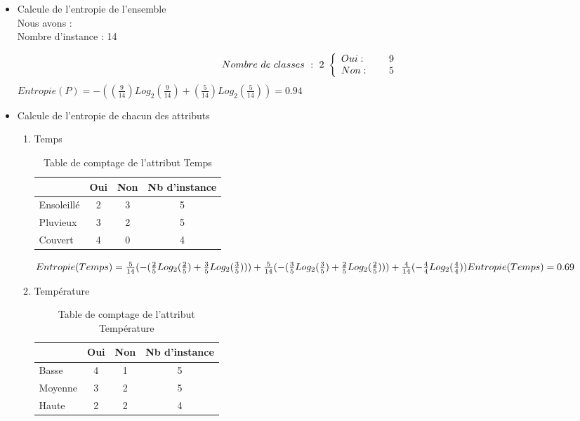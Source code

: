 \documentclass[a4paper, 11pt]{report}
\begin{document}
\begin{itemize}

\item Calcule de l'entropie de l'ensemble\\
Nous avons :\\
Nombre d'instance : 14

\[Nombre \ de \ classes \ : \ 2 \ \left\{ 
\begin{array}{l l}
  Oui : & \quad \text{ 9}\\
  Non : & \quad \text{ 5}\\ \end{array} \right. \]
$Entropie(P) = -((\frac{9}{14})Log_2(\frac{9}{14}) + (\frac{5}{14})Log_2(\frac{5}{14})) = 0.94$

\item Calcule de l'entropie de chacun des attributs
\begin{enumerate}
\item Temps 
\begin{table}[!h]
\begin{center}
\begin{tabular}{| l | c | c | c |}
\hline
 & Oui & Non & Nb d'instance\\
 \hline
Ensoleillé & 2 & 3 & 5 \\
\hline
Pluvieux & 3 & 2 & 5\\
\hline
Couvert & 4 & 0 & 4\\
\hline 
\end{tabular}
\caption{Table de comptage de l'attribut Temps}
\end{center}
\end{table}


$Entropie(Temps) = \frac{5}{14}(- (\frac{2}{5} Log_2(\frac{2}{5}) + \frac{3}{5} Log_2(\frac{3}{5}))) + \\
\frac{5}{14}(- (\frac{3}{5} Log_2(\frac{3}{5}) + \frac{2}{5} Log_2(\frac{2}{5}))) + \\
\frac{4}{14}(- \frac{4}{4} Log_2(\frac{4}{4}))\\
Entropie(Temps) = 0.69$
\item Température
\begin{table}[!h]
\begin{center}
\begin{tabular}{| l | c | c | c |}
\hline
 & Oui & Non & Nb d'instance\\
 \hline
Basse & 4 & 1 & 5 \\
\hline
Moyenne & 3 & 2 & 5\\
\hline
Haute & 2 & 2 & 4\\
\hline 
\end{tabular}
\caption{Table de comptage de l'attribut Température}
\end{center}
\end{table}


\end{enumerate}
\end{itemize}
\end{document}
